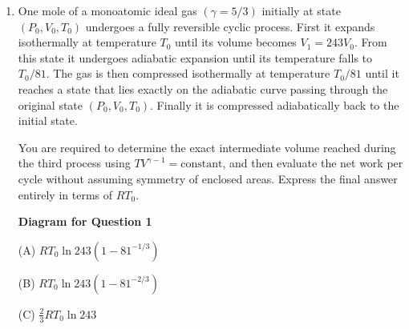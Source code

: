 \documentclass[12pt]{article}
\begin{document}
\begin{enumerate}

\item One mole of a monoatomic ideal gas $(\gamma = 5/3)$ initially at state $(P_0,V_0,T_0)$ undergoes a fully reversible cyclic process. First it expands isothermally at temperature $T_0$ until its volume becomes $V_1 = 243V_0$. From this state it undergoes adiabatic expansion until its temperature falls to $T_0/81$. The gas is then compressed isothermally at temperature $T_0/81$ until it reaches a state that lies exactly on the adiabatic curve passing through the original state $(P_0,V_0,T_0)$. Finally it is compressed adiabatically back to the initial state.

You are required to determine the exact intermediate volume reached during the third process using $TV^{\gamma-1}=\text{constant}$, and then evaluate the net work per cycle without assuming symmetry of enclosed areas. Express the final answer entirely in terms of $RT_0$.


\begin{center}
\textbf{Diagram for Question 1}
\end{center}


(A) $RT_0 \ln 243 \left(1-81^{-1/3}\right)$  

(B) $RT_0 \ln 243 \left(1-81^{-2/3}\right)$  

(C) $\frac{2}{3}RT_0 \ln 243$  


\end{enumerate}
\end{document}
